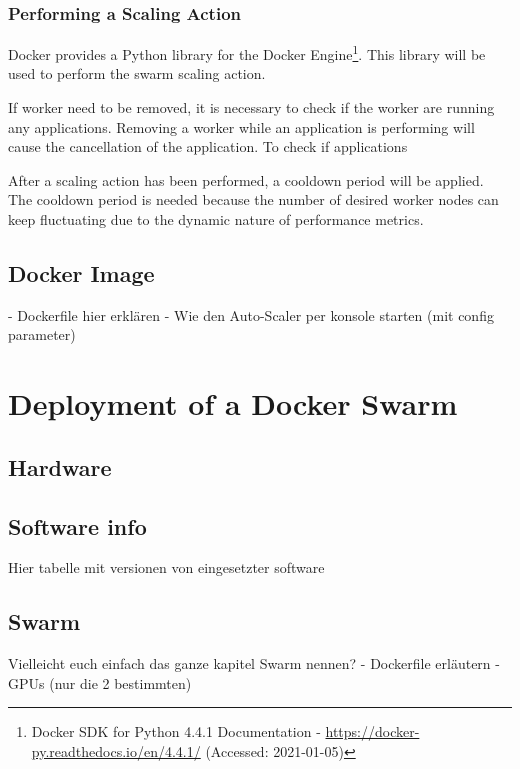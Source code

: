 \subsubsection{Performing a Scaling Action}

%
%


Docker provides a Python library for the Docker Engine\footnote{Docker SDK for Python 4.4.1 Documentation - \url{https://docker-py.readthedocs.io/en/4.4.1/} (Accessed: 2021-01-05)}. This library will be used to perform the swarm scaling action.


If worker need to be removed, it is necessary to check if the worker are running any applications. Removing a worker while an application is performing will cause the cancellation of the application.
To check if applications 


After a scaling action has been performed, a cooldown period will be applied. The cooldown period is needed because the number of desired worker nodes can keep fluctuating due to the dynamic nature of performance metrics.


\subsection{Docker Image}
- Dockerfile hier erklären
- Wie den Auto-Scaler per konsole starten (mit config parameter)


\section{Deployment of a Docker Swarm}


\subsection{Hardware}


\subsection{Software info}
Hier tabelle mit versionen von eingesetzter software


\subsection{Swarm}
Vielleicht euch einfach das ganze kapitel Swarm nennen?
- Dockerfile erläutern
- GPUs (nur die 2 bestimmten)


